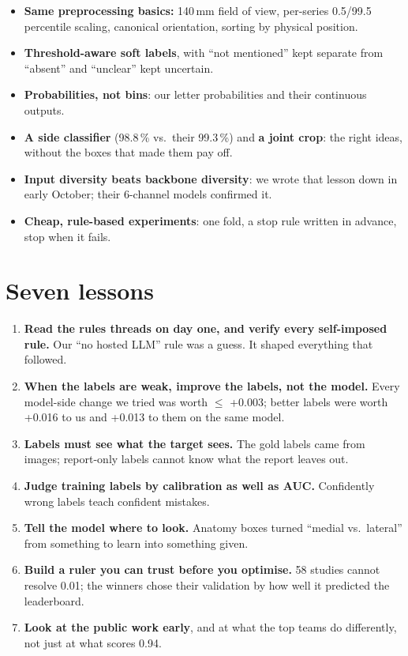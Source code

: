 \begin{itemize}
\item[\cmark] \textbf{Same preprocessing basics:} 140\,mm field of view, per-series 0.5/99.5 percentile scaling,
      canonical orientation, sorting by physical position.
\item[\cmark] \textbf{Threshold-aware soft labels}, with ``not mentioned'' kept separate from ``absent'' and
      ``unclear'' kept uncertain.
\item[\cmark] \textbf{Probabilities, not bins}: our letter probabilities and their continuous outputs.
\item[\cmark] \textbf{A side classifier} (98.8\,\% vs.\ their 99.3\,\%) and \textbf{a joint crop}: the right ideas,
      without the boxes that made them pay off.
\item[\cmark] \textbf{Input diversity beats backbone diversity}: we wrote that lesson down in early October; their
      6-channel models confirmed it.
\item[\cmark] \textbf{Cheap, rule-based experiments}: one fold, a stop rule written in advance, stop when it fails.
\end{itemize}

\section{Seven lessons}

\begin{tcolorbox}[enhanced, colback=keyfill, colframe=keyline, boxrule=0.6pt, arc=1.5mm, fontupper=\small,
   left=3mm, right=3mm, title={\faLightbulb[regular]\ \ Seven lessons}, fonttitle=\bfseries, coltitle=white, colbacktitle=keyline]
\begin{enumerate}[leftmargin=5mm, itemsep=0.4em]
\item \textbf{Read the rules threads on day one, and verify every self-imposed rule.} Our ``no hosted LLM'' rule was a
      guess. It shaped everything that followed.
\item \textbf{When the labels are weak, improve the labels, not the model.} Every model-side change we tried was worth
      $\leq$ +0.003; better labels were worth +0.016 to us and +0.013 to them on the same model.
\item \textbf{Labels must see what the target sees.} The gold labels came from images; report-only labels cannot know
      what the report leaves out.
\item \textbf{Judge training labels by calibration as well as AUC.} Confidently wrong labels teach confident mistakes.
\item \textbf{Tell the model where to look.} Anatomy boxes turned ``medial vs.\ lateral'' from something to learn into
      something given.
\item \textbf{Build a ruler you can trust before you optimise.} 58 studies cannot resolve 0.01; the winners
      chose their validation by how well it predicted the leaderboard.
\item \textbf{Look at the public work early}, and at what the top teams do differently, not just at what scores 0.94.
\end{enumerate}
\end{tcolorbox}

